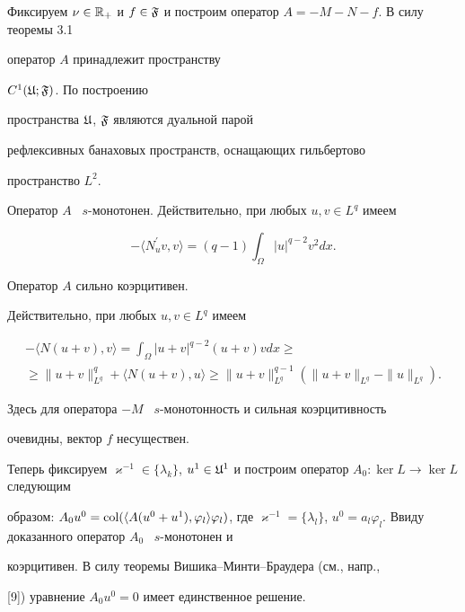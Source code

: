 \begin{pf}


Фиксируем $\nu \in {\Bbb R}_{+}$ и $f \in {\frak


F}$ и построим оператор $A = -M - N - f$. В силу теоремы 3.1


оператор $A$ принадлежит пространству


$C^1({\frak U}; {\frak F})$. По построению


пространства ${\frak U}$, ${\frak F}$ являются дуальной парой


рефлексивных банаховых пространств, оснащающих гильбертово


пространство $L^2$.





Оператор $A$ \ $s$-монотонен. Действительно, при любых $u, v \in L^q$ имеем


$$


- \langle N_u^{\prime}v, v \rangle =


(q - 1) \int_{\Omega } | u | ^{q-2}v^2dx.


$$


Оператор $A$ сильно коэрцитивен. 


Действительно, при любых $u, v \in L^q$ имеем


\begin{multline*}


- \langle N(u + v), v \rangle =


\int_{\Omega } | u + v | ^{q-2}(u + v)vdx \ge \\


%


\ge \| u + v \| ^q _{L^q} + \langle N(u + v), u \rangle \ge


\| u + v \| ^{q-1} _{L^q}(\| u + v \| _{L^q} - \| u \| _{L^q}).


\end{multline*}


Здесь для оператора $-M$ \ $s$-монотонность и сильная коэрцитивность 


очевидны, вектор $f$ несуществен.





Теперь фиксируем $\varkappa^{-1} \in \{ \lambda_k \}$, $u^1 \in {\frak


U}^1$ и построим оператор $A_0: \ker L \to \ker L$ следующим


образом: $A_0u^0 = \col (\langle A(u^0 + u^1), \varphi _l


\rangle \varphi _l )$, где $\varkappa^{-1} = \{ \lambda_l \}$, $u^0


=a_l \varphi _l$. Ввиду доказанного оператор $A_0$ \ $s$-монотонен и


коэрцитивен. В силу теоремы Вишика--Минти--Браудера (см., напр.,


[9]) уравнение $A_0u^0 = 0$ имеет единственное решение.


\end{pf}








